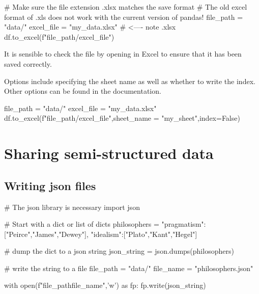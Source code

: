\begin{pycode}
    # Make sure the file extension .xlsx matches the save format
    # The old excel format of .xls does not work with the current version of pandas!
    file_path = "data/"
    excel_file = "my_data.xlsx" # <---- note .xlsx
    df.to_excel(f"{file_path}/{excel_file}")
\end{pycode}

It is sensible to check the file by opening in Excel to ensure that it has been saved correctly.

Options include specifying the sheet name as well as whether to write the index. Other options can be found in the documentation.

\begin{pycode}
    file_path = "data/"
    excel_file = "my_data.xlsx"
    df.to_excel(f"{file_path}/{excel_file}",sheet_name = "my_sheet",index=False)
\end{pycode}

\section{Sharing semi-structured data}

\subsection{Writing json files}

\begin{pycode}
    # The json library is necessary
    import json

    # Start with a dict or list of dicts
    philosophers = {
    "pragmatism":["Peirce","James","Dewey"],
    "idealism":["Plato","Kant","Hegel"]
    }

    # dump the dict to a json string
    json_string = json.dumps(philosophers)

    # write the string to a file
    file_path = "data/"
    file_name = "philosophers.json"

    with open(f"{file_path}{file_name}",'w') as fp:
    fp.write(json_string)

\end{pycode}